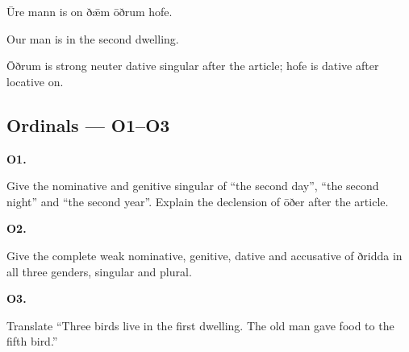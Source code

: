 Ūre mann is on ðǣm ōðrum hofe.

Our man is in the second dwelling.

Ōðrum is strong neuter dative singular after the article; hofe is dative after locative on.

\subsection*{Ordinals — O1–O3}

\par\begin{minipage}{\linewidth}\raggedright
\textbf{O1.}

Give the nominative and genitive singular of “the second day”, “the second night” and “the second year”. Explain the declension of ōðer after the article.

\end{minipage}\par\addvspace{4pt}

\par\begin{minipage}{\linewidth}\raggedright
\textbf{O2.}

Give the complete weak nominative, genitive, dative and accusative of ðridda in all three genders, singular and plural.

\end{minipage}\par\addvspace{4pt}

\par\begin{minipage}{\linewidth}\raggedright
\textbf{O3.}

Translate “Three birds live in the first dwelling. The old man gave food to the fifth bird.”

\end{minipage}\par\addvspace{4pt}

